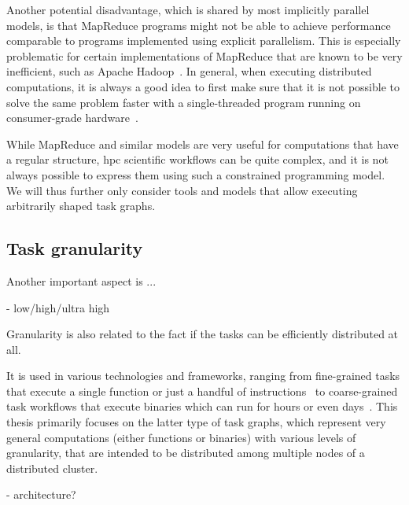 Another potential disadvantage, which is shared by most implicitly parallel models, is that
MapReduce programs might not be able to achieve performance comparable to programs implemented
using explicit parallelism. This is especially problematic for certain implementations of MapReduce
that are known to be very inefficient, such as Apache Hadoop~\cite{hadoop}. In general,
when executing distributed computations, it is always a good idea to first make sure that it is not
possible to solve the same problem faster with a single-threaded program running on consumer-grade
hardware~\cite{cost}.

While MapReduce and similar models are very useful for computations that have a regular structure,
\gls{hpc} scientific workflows can be quite complex, and it is not always possible to
express them using such a constrained programming model. We will thus further only consider tools
and models that allow executing arbitrarily shaped task graphs.

\subsection*{Task granularity}
Another important aspect is ...

- low/high/ultra high

Granularity is also related to the fact if the tasks can be efficiently distributed at all.

It is used in various technologies and frameworks, ranging from fine-grained tasks that execute a
single function or just a handful of instructions~\cite{starpu,openmp} to coarse-grained task
workflows that execute binaries which can run for hours or even days~\cite{dask, snakemake, nextflow}. This
thesis primarily focuses on the latter type of task graphs, which represent very general
computations (either functions or binaries) with various levels of granularity, that are intended
to be distributed among multiple nodes of a distributed cluster.

- architecture?

